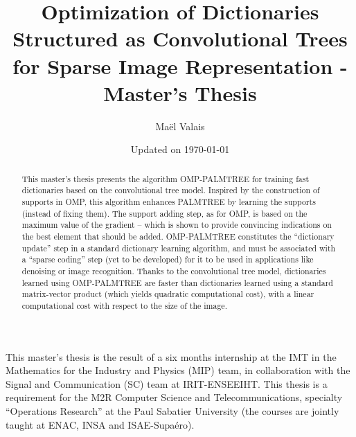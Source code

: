 \author{Maël Valais}
\date{Updated on \today}
\title{Optimization of Dictionaries Structured as Convolutional Trees for Sparse Image Representation - Master’s Thesis}

\pagestyle{empty} \restoregeometry
\pagestyle{body}
\begin{abstract}
This master’s thesis presents the algorithm OMP-PALMTREE for training fast dictionaries based on the convolutional tree model. Inspired by the construction of supports in OMP, this algorithm enhances PALMTREE by learning the supports (instead of fixing them). The  support adding step, as for OMP, is based on the maximum value of the gradient – which is shown to provide convincing indications on the best element that should be added. OMP-PALMTREE constitutes the “dictionary update” step in a standard dictionary learning algorithm, and must be associated with a “sparse coding” step (yet to be developed) for it to be used in applications like denoising or image recognition. Thanks to the convolutional tree model, dictionaries learned using OMP-PALMTREE are faster than dictionaries learned using a standard matrix-vector product (which yields quadratic computational cost), with a linear computational cost with respect to the size of the image.

\end{abstract}


\begin{foreword}[Foreword]
This master's thesis is the result of a six months internship  at the \ac{IMT} in the Mathematics for the Industry and Physics (MIP) team, in collaboration with the Signal and Communication (SC) team at IRIT\footnotemark[1]-ENSEEIHT\footnotemark[2]. This thesis is a requirement for the M2R Computer Science and Telecommunications, specialty “Operations Research” at the Paul Sabatier University (the courses are jointly taught at ENAC, INSA and ISAE-Supaéro).
\end{foreword}


